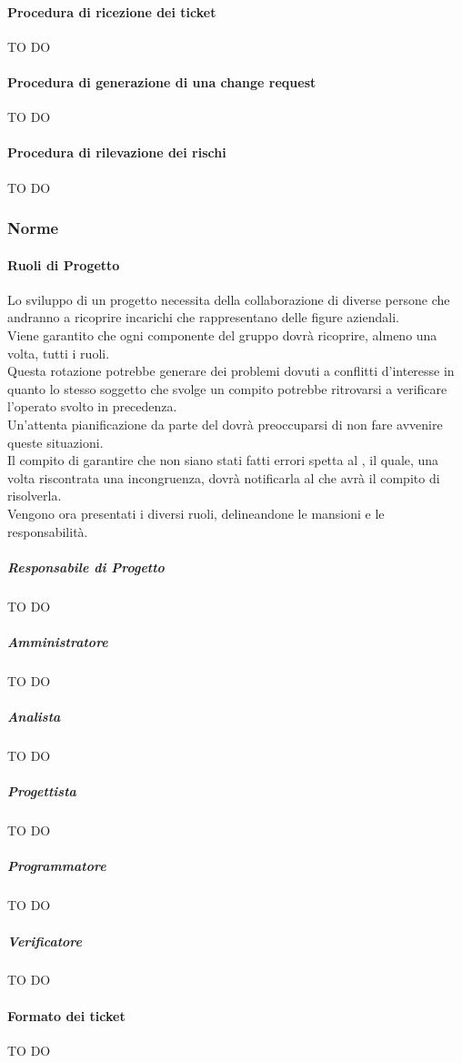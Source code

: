 			\paragraph{Procedura di ricezione dei ticket}
			TO DO
			\paragraph{Procedura di generazione di una change request}
			TO DO
			\paragraph{Procedura di rilevazione dei rischi}
			TO DO


		\subsubsection{Norme}
			\paragraph{Ruoli di Progetto}
			Lo sviluppo di un progetto necessita della collaborazione di diverse persone che andranno a ricoprire incarichi che rappresentano delle figure aziendali. \\
			Viene garantito che ogni componente del gruppo \groupName{} dovrà ricoprire, almeno una volta, tutti i ruoli. \\
			Questa rotazione potrebbe generare dei problemi dovuti a conflitti d'interesse in quanto lo stesso soggetto che svolge un compito potrebbe ritrovarsi a verificare l'operato svolto in precedenza. \\
			Un'attenta pianificazione da parte del \roleProjectManager{} dovrà preoccuparsi di non fare avvenire queste situazioni. \\
			Il compito di garantire che non siano stati fatti errori spetta al \roleVerifier, il quale, una volta riscontrata una incongruenza, dovrà notificarla al \roleProjectManager{} che avrà il compito di risolverla. \\ 
			Vengono ora presentati i diversi ruoli, delineandone le mansioni e le responsabilità.
				\subparagraph{Responsabile di Progetto}
				TO DO
				\subparagraph{Amministratore}
				TO DO
				\subparagraph{Analista}
				TO DO
				\subparagraph{Progettista}
				TO DO
				\subparagraph{Programmatore}
				TO DO
				\subparagraph{Verificatore}
				TO DO
			
			\paragraph{Formato dei ticket}
			TO DO			

